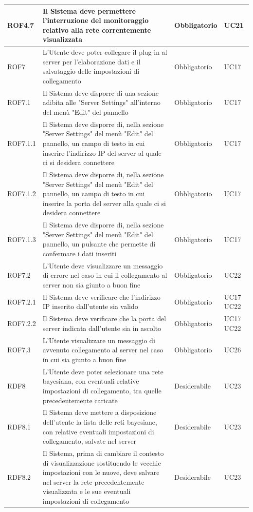 \begin{center}
\begin{longtable}[c]{|m{}|m{}|m{}|m{}|}
\hline
ROF4.7 & Il Sistema deve permettere l'interruzione del monitoraggio relativo alla rete correntemente visualizzata & Obbligatorio & UC21\\
\hline
ROF7 & L'Utente deve poter collegare il plug-in al server per l'elaborazione dati e il salvataggio delle impostazioni di collegamento & Obbligatorio & UC17\\
\hline
\rowcolor{grigio}ROF7.1 & Il Sistema deve disporre di una sezione adibita alle "Server Settings" all'interno del menù "Edit" del pannello & Obbligatorio & UC17\\
\hline
ROF7.1.1 & Il Sistema deve disporre di, nella sezione "Server Settings" del menù "Edit" del pannello, un campo di testo in cui inserire l'indirizzo IP del server al quale ci si desidera connettere & Obbligatorio & UC17\\
\hline
\rowcolor{grigio}ROF7.1.2 & Il Sistema deve disporre di, nella sezione "Server Settings" del menù "Edit" del pannello, un campo di testo in cui inserire la porta del server alla quale ci si desidera connettere & Obbligatorio & UC17\\
\hline
ROF7.1.3 & Il Sistema deve disporre di, nella sezione "Server Settings" del menù "Edit" del pannello, un pulsante che permette di confermare i dati inseriti & Obbligatorio & UC17\\
\hline
\rowcolor{grigio}ROF7.2 & L'Utente deve visualizzare un messaggio di errore nel caso in cui il collegamento al server non sia giunto a buon fine& Obbligatorio & UC22\\
\hline
ROF7.2.1 & Il Sistema deve verificare che l'indirizzo IP inserito dall'utente sia valido & Obbligatorio & UC17 UC22\\
\hline
ROF7.2.2 & Il Sistema deve verificare che la porta del server indicata dall'utente sia in ascolto & Obbligatorio & UC17 UC22\\
\hline
ROF7.3 & L'Utente visualizzare un messaggio di avvenuto collegamento al server nel caso in cui sia giunto a buon fine & Obbligatorio & UC26\\
\hline
RDF8 & L'Utente deve poter selezionare una rete bayesiana, con eventuali relative impostazioni di collegamento, tra quelle precedentemente caricate & Desiderabile & UC23\\
\hline
RDF8.1 & Il Sistema deve mettere a disposizione dell'utente la lista delle reti bayesiane, con relative eventuali impostazioni di collegamento, salvate nel server & Desiderabile & UC23\\
\hline
RDF8.2 & Il Sistema, prima di cambiare il contesto di visualizzazione sostituendo le vecchie impostazioni con le nuove, deve salvare nel server la rete precedentemente visualizzata e le sue eventuali impostazioni di collegamento & Desiderabile & UC23\\

\end{longtable}
\end{center}
